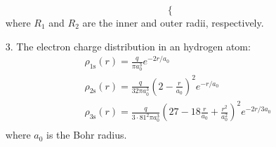 \documentclass[twocolumn]{article}
\begin{document}
\begin{large}
\begin{itemize}
\begin{equation}
\begin{cases}
        \end{cases}
    \end{equation}
    where $R_1$ and $R_2$ are the inner and outer radii, respectively.
    \item[3.] The electron charge distribution in an hydrogen atom:
    \begin{equation}
        \begin{split}
            &\rho_{1\text{s}}(r) = \frac{q}{\pi a_0^3}e^{-2r/a_0} \\
            &\rho_{2\text{s}}(r) = \frac{q}{32\pi a_0^3}\left(2-\frac{r}{a_0}\right)^2e^{-r/a_0} \\
            &\rho_{3\text{s}}(r) = \frac{q}{3\cdot 81^2\pi a_0^3}\left(27-18\frac{r}{a_0}+\frac{r^2}{a_0^2}\right)^2e^{-2r/3a_0} \\
        \end{split}
    \end{equation}
    where $a_0$ is the Bohr radius.
\end{itemize}



\end{large}
\end{document}
